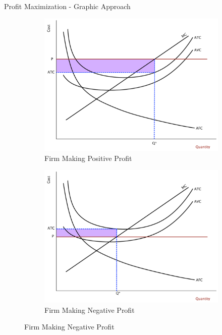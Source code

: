 \documentclass[xcolor={dvipsnames},pdf, hyperref={colorlinks=true, citecolor=ForestGreen, linkcolor=BlueViolet, urlcolor=Magenta}, handout]{beamer}
\begin{document}
\begin{frame}{Profit Maximization - Graphic Approach}

		
		\begin{figure}[H]
			\centering
			\caption{Firm Profits}
			\begin{subfigure}{.45\textwidth}
				\includegraphics[scale=.2]{plot62.pdf}
				\caption{Firm Making Positive Profit}
			\end{subfigure}%
			\begin{subfigure}{.45\textwidth}
				\centering
				\includegraphics[scale=.2]{plot63.pdf}
				\caption{Firm Making Negative Profit}
			\end{subfigure}
		\end{figure}
		
\end{frame}
\end{document}

